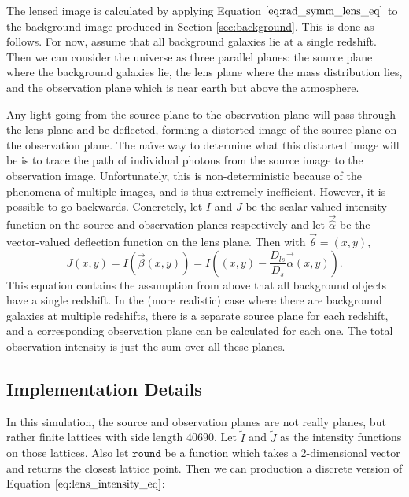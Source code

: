 \documentclass[10pt,twoside]{article}
\theoremstyle{definition}
\theoremstyle{exercise}
\begin{document}
The lensed image is calculated by applying Equation $\eqref{eq:rad_symm_lens_eq}$ to the background image produced in Section \ref{sec:background}. This is done as follows. For now, assume that all background galaxies lie at a single redshift. Then we can consider the universe as three parallel planes: the source plane where the background galaxies lie, the lens plane where the mass distribution lies, and the observation plane which is near earth but above the atmosphere.

Any light going from the source plane to the observation plane will pass through the lens plane and be deflected, forming a distorted image of the source plane on the observation plane. The na\"ive way to determine what this distorted image will be is to trace the path of individual photons from the source image to the observation image. Unfortunately, this is non-deterministic because of the phenomena of multiple images, and is thus extremely inefficient. However, it is possible to go backwards. Concretely, let $I$ and $J$ be the scalar-valued intensity function on the source and observation planes respectively and let $\vec{\hat{\alpha}}$ be the vector-valued deflection function on the lens plane. Then with $\vec{\theta} = (x, y)$,
\begin{equation}
  J(x,y) = I\left( \vec{\beta}(x,y)\right) = I\left( (x,y)- \frac{D_{ls}}{D_s} \vec{\hat{\alpha}}(x,y) \right).
  \label{eq:lens_intensity_eq}
\end{equation}
This equation contains the assumption from above that all background objects have a single redshift. In the (more realistic) case where there are background galaxies at multiple redshifts, there is a separate source plane for each redshift, and a corresponding observation plane can be calculated for each one. The total observation intensity is just the sum over all these planes.


\subsection{Implementation Details}
In this simulation, the source and observation planes are not really planes, but rather finite lattices with side length 40690. Let $\tilde{I}$ and $\tilde{J}$ as the intensity functions on those lattices. Also let $\texttt{round}$ be a function which takes a 2-dimensional vector and returns the closest lattice point. Then we can production a discrete version of Equation $\eqref{eq:lens_intensity_eq}$:
\end{document}
